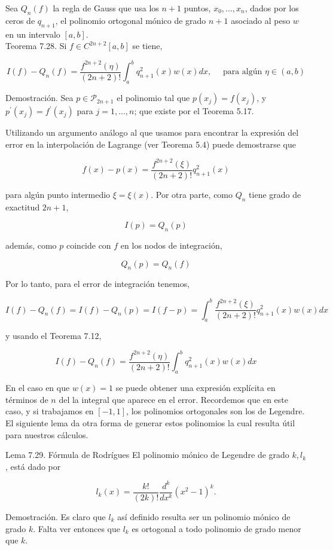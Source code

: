 \documentclass[10pt]{book}
\begin{document}
Sea $Q_{n}(f)$ la regla de Gauss que usa los $n+1$ puntos, $x_{0}, \ldots, x_{n}$, dados por los ceros de $q_{n+1}$, el polinomio ortogonal mónico de grado $n+1$ asociado al peso $w$ en un intervalo $[a, b]$.\\
Teorema 7.28. Si $f \in C^{2 n+2}[a, b]$ se tiene,

$$
I(f)-Q_{n}(f)=\frac{f^{2 n+2}(\eta)}{(2 n+2)!} \int_{a}^{b} q_{n+1}^{2}(x) w(x) d x, \quad \text { para algún } \eta \in(a, b)
$$

Demostración. Sea $p \in \mathcal{P}_{2 n+1}$ el polinomio tal que $p\left(x_{j}\right)=f\left(x_{j}\right)$, y $p^{\prime}\left(x_{j}\right)=f^{\prime}\left(x_{j}\right)$ para $j=1, \ldots, n$; que existe por el Teorema 5.17.

Utilizando un argumento análogo al que usamos para encontrar la expresión del error en la interpolación de Lagrange (ver Teorema 5.4) puede demostrarse que

$$
f(x)-p(x)=\frac{f^{2 n+2}(\xi)}{(2 n+2)!} q_{n+1}^{2}(x)
$$

para algún punto intermedio $\xi=\xi(x)$. Por otra parte, como $Q_{n}$ tiene grado de exactitud $2 n+1$,

$$
I(p)=Q_{n}(p)
$$

además, como $p$ coincide con $f$ en los nodos de integración,

$$
Q_{n}(p)=Q_{n}(f)
$$

Por lo tanto, para el error de integración tenemos,

$$
I(f)-Q_{n}(f)=I(f)-Q_{n}(p)=I(f-p)=\int_{a}^{b} \frac{f^{2 n+2}(\xi)}{(2 n+2)!} q_{n+1}^{2}(x) w(x) d x
$$

y usando el Teorema 7.12,

$$
I(f)-Q_{n}(f)=\frac{f^{2 n+2}(\eta)}{(2 n+2)!} \int_{a}^{b} q_{n+1}^{2}(x) w(x) d x
$$

En el caso en que $w(x)=1$ se puede obtener una expresión explícita en términos de $n$ del la integral que aparece en el error. Recordemos que en este caso, y si trabajamos en $[-1,1]$, los polinomios ortogonales son los de Legendre. El siguiente lema da otra forma de generar estos polinomios la cual resulta útil para nuestros cálculos.

Lema 7.29. Fórmula de Rodrígues El polinomio mónico de Legendre de grado $k, l_{k}$, está dado por

$$
l_{k}(x)=\frac{k!}{(2 k)!} \frac{d^{k}}{d x^{k}}\left(x^{2}-1\right)^{k} .
$$

Demostración. Es claro que $l_{k}$ así definido resulta ser un polinomio mónico de grado $k$. Falta ver entonces que $l_{k}$ es ortogonal a todo polinomio de grado menor que $k$.
\end{document}
